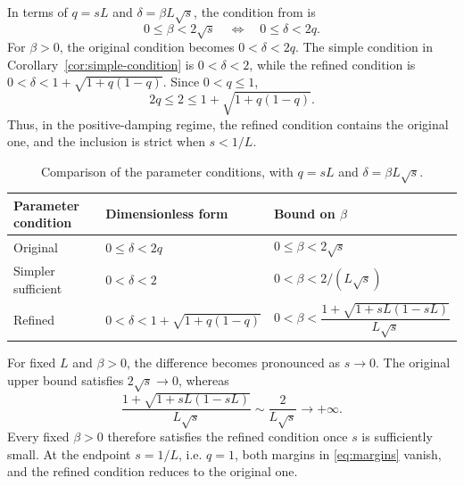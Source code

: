 \documentclass[11pt]{article}
\theoremstyle{plain}
\theoremstyle{definition}
\begin{document}
In terms of $q=sL$ and $\delta=\beta L\sqrt{s}$, the condition from
\cite[Theorem~6]{AFCR2022} is
\begin{equation}
\label{eq:old-condition}
0\leq\beta<2\sqrt{s}
\quad\Longleftrightarrow\quad
0\leq\delta<2q.
\end{equation}
For $\beta>0$, the original condition becomes $0<\delta<2q$. The simple
condition in Corollary~\ref{cor:simple-condition} is $0<\delta<2$, while the
refined condition is $0<\delta<1+\sqrt{1+q(1-q)}$. Since $0<q\leq1$,
$$
2q\leq2\leq1+\sqrt{1+q(1-q)}.
$$
Thus, in the positive-damping regime, the refined condition contains the
original one, and the inclusion is strict when $s<1/L$.
\begin{table}[htbp]
\centering
\caption{Comparison of the parameter conditions, with
$q=sL$ and $\delta=\beta L\sqrt{s}$.}
\label{tab:parameter-comparison}
\begin{tabularx}{\textwidth}{
@{}
p{}
>{\centering\arraybackslash}p{}
>{\centering\arraybackslash}X
@{}
}
\toprule
Parameter condition & Dimensionless form & Bound on $\beta$ \\
\midrule
Original
& $0\leq\delta<2q$
& $0\leq\beta<2\sqrt{s}$ \\

Simpler sufficient
& $0<\delta<2$
& $0<\beta<2/(L\sqrt{s})$ \\

Refined
& $0<\delta<1+\sqrt{1+q(1-q)}$
& \mbox{$0<\beta<
\dfrac{1+\sqrt{1+sL(1-sL)}}{L\sqrt{s}}$} \\
\bottomrule
\end{tabularx}
\end{table}
For fixed $L$ and $\beta>0$, the difference becomes pronounced as
$s\to0$. The original upper bound satisfies $2\sqrt{s}\to0$, whereas
$$
\frac{1+\sqrt{1+sL(1-sL)}}{L\sqrt{s}}
\sim\frac{2}{L\sqrt{s}}\longrightarrow+\infty.
$$
Every fixed $\beta>0$ therefore satisfies the refined condition once $s$ is
sufficiently small. At the endpoint $s=1/L$, i.e. $q=1$, both margins in
\eqref{eq:margins} vanish, and the refined condition reduces to the original
one.
\end{document}
